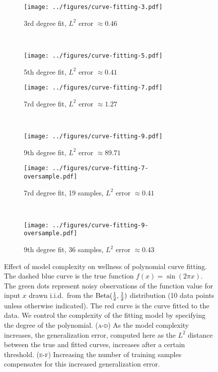 \begin{figure}
  \centering

  \begin{subfigure}{0.47\textwidth}
    \centering
    \texttt{[image: ../figures/curve-fitting-3.pdf]}
    \caption{3rd degree fit, $L^2 \text{ error } \approx 0.46$}
  \end{subfigure}
  ~
  \begin{subfigure}{0.47\textwidth}
    \centering
    \texttt{[image: ../figures/curve-fitting-5.pdf]}
    \caption{5th degree fit, $L^2 \text{ error } \approx 0.41$}
  \end{subfigure}

  \begin{subfigure}{0.47\textwidth}
    \centering
    \texttt{[image: ../figures/curve-fitting-7.pdf]}
    \caption{7rd degree fit, $L^2 \text{ error } \approx 1.27$}
  \end{subfigure}
  ~
  \begin{subfigure}{0.47\textwidth}
    \centering
    \texttt{[image: ../figures/curve-fitting-9.pdf]}
    \caption{9th degree fit, $L^2 \text{ error } \approx 89.71$}
  \end{subfigure}

  \begin{subfigure}{0.47\textwidth}
    \centering
    \texttt{[image: ../figures/curve-fitting-7-oversample.pdf]}
    \caption{7rd degree fit, 19 samples, $L^2 \text{ error } \approx 0.41$}
  \end{subfigure}
  ~
  \begin{subfigure}{0.47\textwidth}
    \centering
    \texttt{[image: ../figures/curve-fitting-9-oversample.pdf]}
    \caption{9th degree fit, 36 samples, $L^2 \text{ error } \approx 0.43$}
  \end{subfigure}

  \caption{Effect of model complexity on wellness of polynomial curve fitting.
  The dashed blue curve is the true function $f(x) = \sin (2 \pi x)$. The green
  dots represent noisy observations of the function value for input $x$ drawn
  i.i.d.\ from the $\text{Beta}(\frac{1}{2}, \frac{1}{2})$ distribution (10 data
  points unless otherwise indicated).  The red curve is the curve fitted to the
  data.  We control the complexity of the fitting model by specifying the degree
  of the polynomial. (\textsc{a}-\textsc{d}) As the model complexity increases,
  the generalization error, computed here as the $L^2$ distance between the true
  and fitted curves, increases after a certain threshold.
  (\textsc{e}-\textsc{f}) Increasing the number of training samples compensates
  for this increased generalization error.}
  \label{fig:curve-fitting}
\end{figure}

